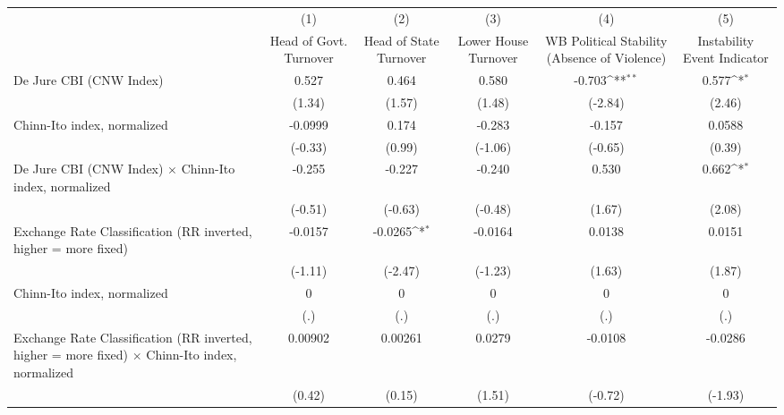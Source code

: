 {
\def\sym#1{\ifmmode^{#1}\else\(^{#1}\)\fi}
\begin{tabular}{l*{5}{c}}
\hline\hline
                &\multicolumn{1}{c}{(1)}&\multicolumn{1}{c}{(2)}&\multicolumn{1}{c}{(3)}&\multicolumn{1}{c}{(4)}&\multicolumn{1}{c}{(5)}\\
                &\multicolumn{1}{c}{Head of Govt. Turnover}&\multicolumn{1}{c}{Head of State Turnover}&\multicolumn{1}{c}{Lower House Turnover}&\multicolumn{1}{c}{WB Political Stability (Absence of Violence)}&\multicolumn{1}{c}{Instability Event Indicator}\\
\hline
De Jure CBI (CNW Index)&    0.527         &    0.464         &    0.580         &   -0.703\sym{**} &    0.577\sym{*}  \\
                &   (1.34)         &   (1.57)         &   (1.48)         &  (-2.84)         &   (2.46)         \\
[1em]
Chinn-Ito index, normalized&  -0.0999         &    0.174         &   -0.283         &   -0.157         &   0.0588         \\
                &  (-0.33)         &   (0.99)         &  (-1.06)         &  (-0.65)         &   (0.39)         \\
[1em]
De Jure CBI (CNW Index) $\times$ Chinn-Ito index, normalized&   -0.255         &   -0.227         &   -0.240         &    0.530         &    0.662\sym{*}  \\
                &  (-0.51)         &  (-0.63)         &  (-0.48)         &   (1.67)         &   (2.08)         \\
[1em]
Exchange Rate Classification (RR inverted, higher = more fixed)&  -0.0157         &  -0.0265\sym{*}  &  -0.0164         &   0.0138         &   0.0151         \\
                &  (-1.11)         &  (-2.47)         &  (-1.23)         &   (1.63)         &   (1.87)         \\
[1em]
Chinn-Ito index, normalized&        0         &        0         &        0         &        0         &        0         \\
                &      (.)         &      (.)         &      (.)         &      (.)         &      (.)         \\
[1em]
Exchange Rate Classification (RR inverted, higher = more fixed) $\times$ Chinn-Ito index, normalized&  0.00902         &  0.00261         &   0.0279         &  -0.0108         &  -0.0286         \\
                &   (0.42)         &   (0.15)         &   (1.51)         &  (-0.72)         &  (-1.93)         \\

\end{tabular}}
